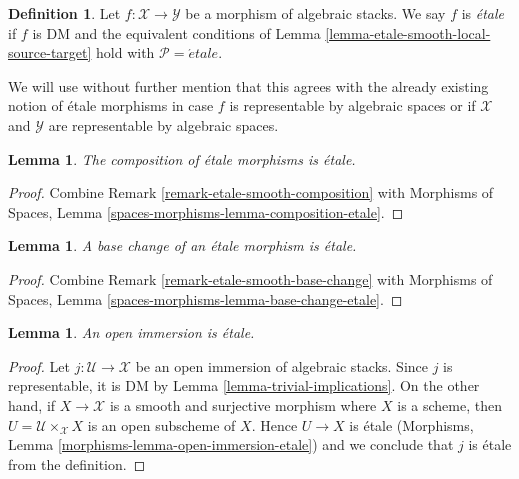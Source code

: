 \documentclass{stacks-project}
\theoremstyle{plain}
\newtheorem{lemma}[subsection]{Lemma}
\theoremstyle{definition}
\newtheorem{definition}[subsection]{Definition}
\theoremstyle{remark}
\numberwithin{equation}{subsection}
\def\etale{{\acute{e}tale}}
\begin{document}
\begin{definition}
\label{definition-etale}
Let $f : \mathcal{X} \to \mathcal{Y}$ be a morphism of algebraic stacks.
We say $f$ is {\it \'etale} if $f$ is DM and the equivalent conditions of
Lemma \ref{lemma-etale-smooth-local-source-target}
hold with $\mathcal{P} = \etale$.
\end{definition}

\noindent
We will use without further mention that this agrees with the already
existing notion of \'etale morphisms in case $f$ is representable
by algebraic spaces or if $\mathcal{X}$ and $\mathcal{Y}$ are
representable by algebraic spaces.

\begin{lemma}
\label{lemma-composition-etale}
The composition of \'etale morphisms is \'etale.
\end{lemma}

\begin{proof}
Combine Remark \ref{remark-etale-smooth-composition}
with
Morphisms of Spaces, Lemma \ref{spaces-morphisms-lemma-composition-etale}.
\end{proof}

\begin{lemma}
\label{lemma-base-change-etale}
A base change of an \'etale morphism is \'etale.
\end{lemma}

\begin{proof}
Combine
Remark \ref{remark-etale-smooth-base-change}
with
Morphisms of Spaces, Lemma \ref{spaces-morphisms-lemma-base-change-etale}.
\end{proof}

\begin{lemma}
\label{lemma-open-immersion-etale}
An open immersion is \'etale.
\end{lemma}

\begin{proof}
Let $j : \mathcal{U} \to \mathcal{X}$ be an open immersion of
algebraic stacks. Since $j$ is representable, it is DM by
Lemma \ref{lemma-trivial-implications}. On the other hand,
if $X \to \mathcal{X}$ is a smooth and surjective morphism
where $X$ is a scheme, then $U = \mathcal{U} \times_\mathcal{X} X$
is an open subscheme of $X$. Hence $U \to X$ is \'etale
(Morphisms, Lemma \ref{morphisms-lemma-open-immersion-etale})
and we conclude that $j$ is \'etale from the definition.
\end{proof}
\end{document}

